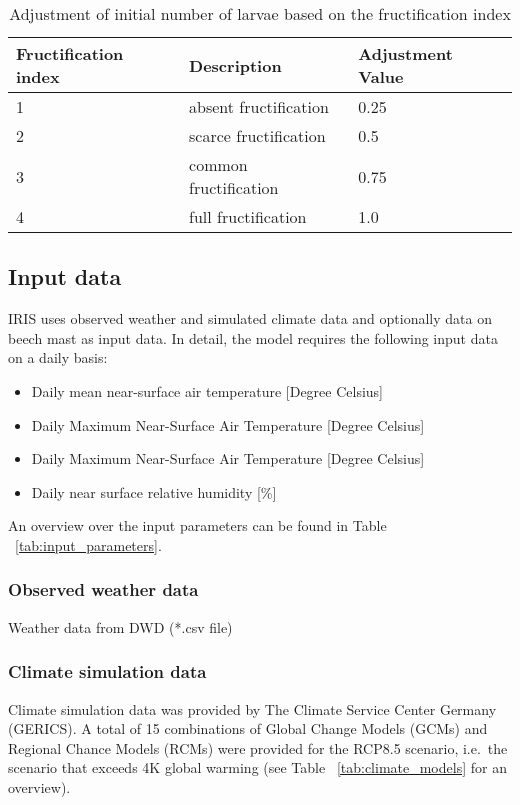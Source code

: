 \documentclass[a4paper, 11pt]{scrartcl}
\begin{document}
\begin{table}[h!]
\caption{Adjustment of initial number of larvae based on the fructification index}
\label{tab:fructification_adjustment}
\begin{tabularx}{\textwidth}{@{}lll@{}}
\toprule
\textbf{Fructification index} & \textbf{Description}    & \textbf{Adjustment Value}  	\\
\midrule
1				 	  		  & absent fructification 	& 	0.25	 			\\
2 				 	  		  & scarce fructification	&	0.5					\\
3 					  		  & common fructification	& 	0.75				\\
4					 		  & full fructification 	& 	1.0					\\
\bottomrule
\end{tabularx}
\end{table}




\subsection{Input data}
IRIS uses observed weather and simulated climate data and optionally data on beech mast as input data. In detail, the model requires the following input data on a daily basis:
\begin{itemize}
\item Daily mean near-surface air temperature [Degree Celsius]
\item Daily Maximum Near-Surface Air Temperature [Degree Celsius]
\item Daily Maximum Near-Surface Air Temperature [Degree Celsius]
\item Daily near surface relative humidity [\%]
\end{itemize}

An overview over the input parameters can be found in Table ~\ref{tab:input_parameters}.


\subsubsection{Observed weather data}
Weather data from DWD (*.csv file)

\subsubsection{Climate simulation data}
Climate simulation data was provided by The Climate Service Center Germany (GERICS). A total of 15 combinations of Global Change Models
(GCMs) and Regional Chance Models (RCMs) were provided for the RCP8.5 scenario, i.e.\ the scenario that exceeds 4K global warming
(see Table ~\ref{tab:climate_models} for an overview).
\end{document}
